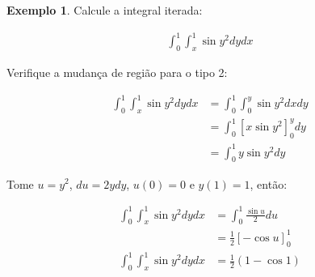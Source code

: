 \documentclass{article}
\theoremstyle{definition}
\newtheorem{example}{Exemplo}[section]
\begin{document}
        \begin{example}
            Calcule a integral iterada:
            
            \begin{align*}
                \int_0^1 \int_x^1 \sin{y^2} dy dx
            \end{align*}

            Verifique a mudança de região para o tipo 2:

            \begin{align*}
                \int_0^1 \int_x^1 \sin{y^2} dy dx &= \int_0^1 \int_0^y \sin{y^2} dx dy\\
                &= \int_0^1 \left[ x\sin{y^2} \right]_0^y dy\\
                &= \int_0^1 y\sin{y^2} dy
            \end{align*}

            Tome $u = y^2$, $du = 2ydy$, $u(0) = 0$ e $y(1) = 1$, então:

            \begin{align*}
                \int_0^1 \int_x^1 \sin{y^2} dy dx &= \int_0^1 \frac{\sin{u}}{2} du\\
                &= \frac{1}{2} \left[ -\cos{u} \right]_0^1\\
                \int_0^1 \int_x^1 \sin{y^2} dy dx &= \frac{1}{2} \left( 1 - \cos{1} \right)\\
            \end{align*}
        \end{example}
\end{document}
